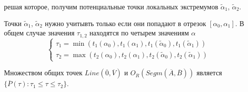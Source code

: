 решая которое, получим потенциальные точки локальных экстремумов $\tilde{\alpha}_1$, $\tilde{\alpha}_2$.

Точки $\tilde{\alpha}_1$, $\tilde{\alpha}_2$ нужно учитывть только если они попадают в отрезок $[\alpha_0, \alpha_1]$.
В общем случае значения $\tau_{1,2}$ находятся по четырем значениям $\alpha$
\begin{equation}
	\left\{
		\begin{aligned}
			\tau_1 = \min(t_1(\alpha_0), t_1(\alpha_1), t_1(\tilde{\alpha}_0), t_1(\tilde{\alpha}_1)) \\
			\tau_2 = \max(t_2(\alpha_0), t_2(\alpha_1), t_2(\tilde{\alpha}_0), t_2(\tilde{\alpha}_1))
		\end{aligned}
	\right.
\end{equation}

Множеством общих точек $Line(\overline{0}, \overline{V})$ и $O_R(Segm(\overline{A}, \overline{B}))$ является $\{ \overline{P}(\tau): \tau_1 \le \tau \le \tau_2 \}$.
